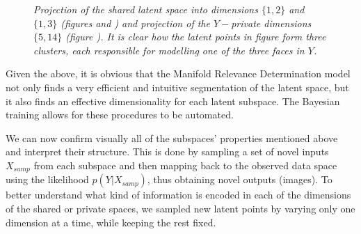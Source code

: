 \hspace{-6pt}
\begin{figure}[ht]
\begin{center}
\hspace{-5pt}
\hspace{-5pt}
\end{center}
\vspace{-9pt}
\caption{\small{ \it
Projection of the shared latent space into dimensions $\{1,2\}$ and $\{1,3\}$ (figures
 and ) and projection of the $Y-$private dimensions $\{5,14\}$
(figure ).
 It is clear how the latent points in figure
 form three clusters, each responsible for modelling one of the three faces in $Y$.
}}
\label{fig:yale6SetsLatentSpace}
\vspace{-8pt}
\end{figure}
\hspace{-6pt}


\par Given the above, it is obvious that the Manifold Relevance Determination model not only finds a very efficient and intuitive segmentation of the latent space, but it also
finds an effective dimensionality for each latent subspace. The Bayesian training allows for these procedures to be automated.

We can now confirm visually all of the subspaces' properties mentioned above and interpret their structure.
This is done by sampling a set of novel inputs $X_{samp}$ from each subspace and then mapping back to the observed data space using the
likelihood $p(Y|X_{samp})$, thus obtaining novel outputs (images).
To better understand what kind of information is encoded in each of the dimensions
of the shared or private spaces, we sampled new latent points by varying only one dimension at a time, while keeping the rest fixed. 


